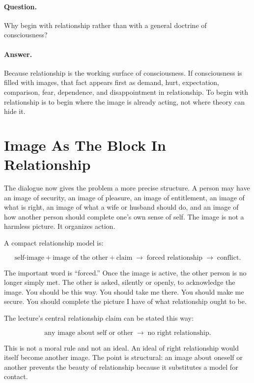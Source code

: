 \paragraph{Question.}
Why begin with relationship rather than with a general doctrine of consciousness?

\paragraph{Answer.}
Because relationship is the working surface of consciousness. If consciousness is filled with images, that fact appears first as demand, hurt, expectation, comparison, fear, dependence, and disappointment in relationship. To begin with relationship is to begin where the image is already acting, not where theory can hide it.

\section{Image As The Block In Relationship}

The dialogue now gives the problem a more precise structure. A person may have an image of security, an image of pleasure, an image of entitlement, an image of what is right, an image of what a wife or husband should do, and an image of how another person should complete one's own sense of self. The image is not a harmless picture. It organizes action.

A compact relationship model is:

\begin{equation}
\text{self-image}
+
\text{image of the other}
+
\text{claim}
\;\longrightarrow\;
\text{forced relationship}
\;\longrightarrow\;
\text{conflict}.
\end{equation}

The important word is ``forced.'' Once the image is active, the other person is no longer simply met. The other is asked, silently or openly, to acknowledge the image. You should be this way. You should take me there. You should make me secure. You should complete the picture I have of what relationship ought to be.

The lecture's central relationship claim can be stated this way:

\begin{equation}
\text{any image about self or other}
\;\longrightarrow\;
\text{no right relationship}.
\end{equation}

This is not a moral rule and not an ideal. An ideal of right relationship would itself become another image. The point is structural: an image about oneself or another prevents the beauty of relationship because it substitutes a model for contact.

